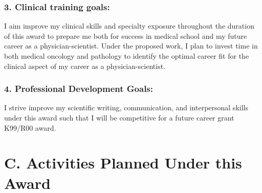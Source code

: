 \documentclass{NIHGrant}
\begin{document}
\subsubsection*{3. Clinical training goals:}
I aim improve my clinical skills and specialty exposure throughout the duration of this award to prepare me both for success in medical school and my future career as a physician-scientist. Under the proposed work, I plan to invest time in both medical oncology and pathology to identify the optimal career fit for the clinical aspect of my career as a physician-scientist.

\subsubsection*{4. Professional Development Goals:}
I strive improve my scientific writing, communication, and interpersonal skills under this award such that I will be competitive for a future career grant K99/R00 award.

\section*{C. Activities Planned Under this Award}
\end{document}
